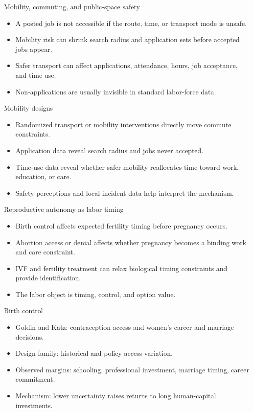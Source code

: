 \documentclass[aspectratio=169,11pt]{beamer}
\begin{document}
\begin{frame}{Mobility, commuting, and public-space safety}
\begin{itemize}
    \item A posted job is not accessible if the route, time, or transport mode is unsafe.
    \item Mobility risk can shrink search radius and application sets before accepted jobs appear.
    \item Safer transport can affect applications, attendance, hours, job acceptance, and time use.
    \item Non-applications are usually invisible in standard labor-force data.
\end{itemize}
\end{frame}

\begin{frame}{Mobility designs}
\begin{itemize}
    \item Randomized transport or mobility interventions directly move commute constraints.
    \item Application data reveal search radius and jobs never accepted.
    \item Time-use data reveal whether safer mobility reallocates time toward work, education, or care.
    \item Safety perceptions and local incident data help interpret the mechanism.
\end{itemize}
\end{frame}

\begin{frame}{Reproductive autonomy as labor timing}
\begin{itemize}
    \item Birth control affects expected fertility timing before pregnancy occurs.
    \item Abortion access or denial affects whether pregnancy becomes a binding work and care constraint.
    \item IVF and fertility treatment can relax biological timing constraints and provide identification.
    \item The labor object is timing, control, and option value.
\end{itemize}
\end{frame}

\begin{frame}{Birth control}
\begin{itemize}
    \item Goldin and Katz: contraception access and women's career and marriage decisions.
    \item Design family: historical and policy access variation.
    \item Observed margins: schooling, professional investment, marriage timing, career commitment.
    \item Mechanism: lower uncertainty raises returns to long human-capital investments.
\end{itemize}
\end{frame}
\end{document}
